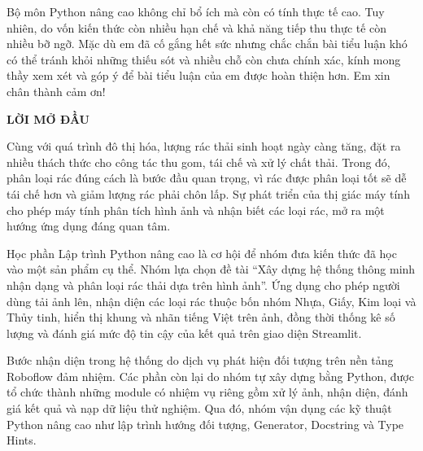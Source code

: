 \documentclass[a4paper,13pt]{extarticle}
\begin{document}
Bộ môn Python nâng cao không chỉ bổ ích mà còn có tính thực tế cao. Tuy nhiên, do vốn kiến thức còn nhiều hạn chế và khả năng tiếp thu thực tế còn nhiều bỡ ngỡ. Mặc dù em đã cố gắng hết sức nhưng chắc chắn bài tiểu luận khó có thể tránh khỏi những thiếu sót và nhiều chỗ còn chưa chính xác, kính mong thầy xem xét và góp ý để bài tiểu luận của em được hoàn thiện hơn.
Em xin chân thành cảm ơn!


\newpage
\thispagestyle{empty}
\renewcommand{\contentsname}{\centering MỤC LỤC}
\tableofcontents

{}
\lstlistoflistings
\newpage

\newpage
\thispagestyle{empty}

\begin{center}
    {\fontsize{16}{20}\selectfont \textbf{LỜI MỞ ĐẦU}}\\[0.5cm]
\end{center}

Cùng với quá trình đô thị hóa, lượng rác thải sinh hoạt ngày càng tăng, đặt ra nhiều thách thức cho công tác thu gom, tái chế và xử lý chất thải. Trong đó, phân loại rác đúng cách là bước đầu quan trọng, vì rác được phân loại tốt sẽ dễ tái chế hơn và giảm lượng rác phải chôn lấp. Sự phát triển của thị giác máy tính cho phép máy tính phân tích hình ảnh và nhận biết các loại rác, mở ra một hướng ứng dụng đáng quan tâm.

Học phần Lập trình Python nâng cao là cơ hội để nhóm đưa kiến thức đã học vào một sản phẩm cụ thể. Nhóm lựa chọn đề tài “Xây dựng hệ thống thông minh nhận dạng và phân loại rác thải dựa trên hình ảnh”. Ứng dụng cho phép người dùng tải ảnh lên, nhận diện các loại rác thuộc bốn nhóm Nhựa, Giấy, Kim loại và Thủy tinh, hiển thị khung và nhãn tiếng Việt trên ảnh, đồng thời thống kê số lượng và đánh giá mức độ tin cậy của kết quả trên giao diện Streamlit.

Bước nhận diện trong hệ thống do dịch vụ phát hiện đối tượng trên nền tảng Roboflow đảm nhiệm. Các phần còn lại do nhóm tự xây dựng bằng Python, được tổ chức thành những module có nhiệm vụ riêng gồm xử lý ảnh, nhận diện, đánh giá kết quả và nạp dữ liệu thử nghiệm. Qua đó, nhóm vận dụng các kỹ thuật Python nâng cao như lập trình hướng đối tượng, Generator, Docstring và Type Hints.
\end{document}
